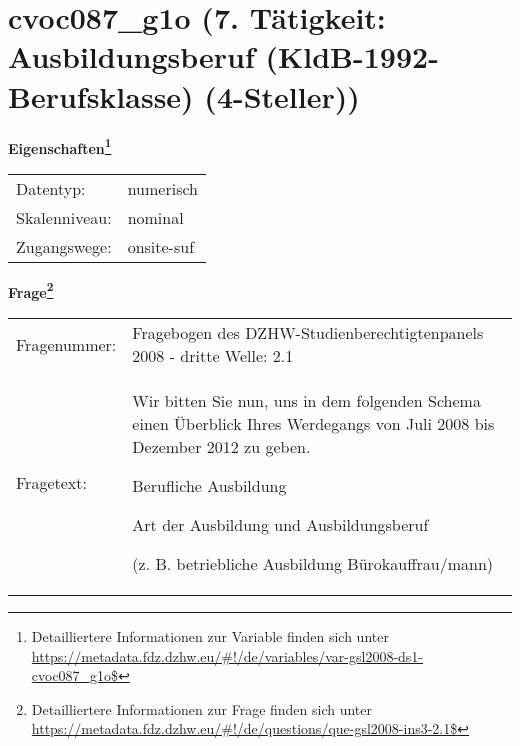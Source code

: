 
    \setcounter{footnote}{0}

    \vspace*{-1.8cm}
	\section{cvoc087\_g1o (7. Tätigkeit: Ausbildungsberuf (KldB-1992-Berufsklasse) (4-Steller))}
	\label{section:cvoc087_g1o}



    \vspace*{0.5cm}
    \noindent\textbf{Eigenschaften\footnote{Detailliertere Informationen zur Variable finden sich unter
		\url{https://metadata.fdz.dzhw.eu/\#!/de/variables/var-gsl2008-ds1-cvoc087_g1o$}}}\\
	\begin{tabularx}{\hsize}{@{}lX}
	Datentyp: & numerisch \\
	Skalenniveau: & nominal \\
	Zugangswege: &
	  onsite-suf
 \\
    \end{tabularx}



				\vspace*{0.5cm}
                \noindent\textbf{Frage\footnote{Detailliertere Informationen zur Frage finden sich unter
		              \url{https://metadata.fdz.dzhw.eu/\#!/de/questions/que-gsl2008-ins3-2.1$}}}\\
				\begin{tabularx}{\hsize}{@{}lX}
					Fragenummer: &
					  Fragebogen des DZHW-Studienberechtigtenpanels 2008 - dritte Welle:
					  2.1
 \\
					Fragetext: & Wir bitten Sie nun, uns in dem folgenden Schema einen Überblick Ihres Werdegangs von Juli 2008 bis Dezember 2012 zu geben.\par  Berufliche Ausbildung\par  Art der Ausbildung und Ausbildungsberuf\par  (z. B. betriebliche Ausbildung Bürokauffrau/mann) \\
				\end{tabularx}





